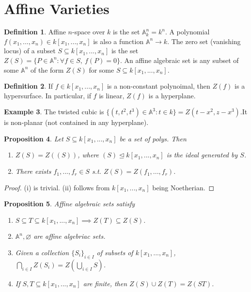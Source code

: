 \documentclass{article}
\theoremstyle{definition}
\newtheorem{defn}{Definition}[section]
\newtheorem{example}[defn]{Example}
\theoremstyle{remark}
\theoremstyle{plain}
\newtheorem{prop}[defn]{Proposition}
\newcommand{\bA}{\mathbb{A}}
\begin{document}
\section{Affine Varieties}
\begin{defn}
    Affine $n$-space over $k$ is the set $\bA_k^n=k^n$. A polynomial $f(x_1,...,x_n)\in k[x_1,...,x_n]$ is also a function $\bA^n\to k$. The zero set (vanishing locus) of a subset $S\subseteq k[x_1,...,x_n]$ is the set $Z(S)=\{P\in\bA^n:\forall f\in S,\ f(P)=0\}$. An affine algebraic set is any subset of some $\bA^n$ of the form $Z(S)$ for some $S\subseteq k[x_1,...,x_n]$.
\end{defn}
\begin{defn}
    If $f\in k[x_1,...,x_n]$ is a non-constant polynoimal, then $Z(f)$ is a hypersurface. In particular, if $f$ is linear, $Z(f)$ is a hyperplane.
\end{defn}
\begin{example}
    The twisted cubic is $\{(t,t^2,t^3)\in\bA^3:t\in k\}=Z(t-x^2,z-x^3)$.It is non-planar (not contained in any hyperplane).
\end{example}
\begin{prop}
    Let $S\subseteq k[x_1,...,x_n]$ be a set of polys. Then
    \begin{enumerate}
        \item[(i)] $Z(S)=Z((S))$, where $(S)\trianglelefteq k[x_1,...,x_n]$ is the ideal generated by $S$.
        \item[(ii)] There exists $f_1,...,f_r\in S$ s.t. $Z(S)=Z(f_1,...,f_r)$.
    \end{enumerate}
\end{prop}
\begin{proof}
    (i) is trivial. (ii) follows from $k[x_1,...,x_n]$ being Noetherian.
\end{proof}
\begin{prop}
    Affine algebraic sets satisfy
    \begin{enumerate}
        \item[(i)]$S\subseteq T\subseteq k[x_1,...,x_n]\implies Z(T)\subseteq Z(S)$.
        \item[(ii)] $\bA^n,\varnothing$ are affine algebriac sets.
        \item[(iii)] Given a collection $\{S_i\}_{i\in I}$ of subsets of $k[x_1,...,x_n]$, $\bigcap_{i\in I} Z(S_i)=Z(\bigcup_{i\in I}S)$.
        \item[(iv)] If $S,T\subseteq k[x_1,...,x_n]$ are finite, then $Z(S)\cup Z(T)=Z(ST)$.
    \end{enumerate}
\end{prop}
\end{document}
